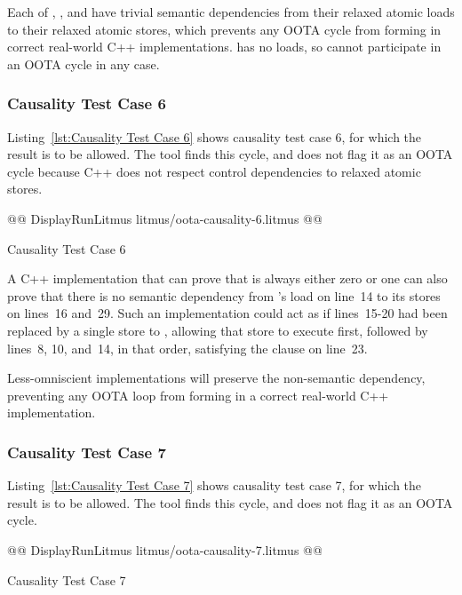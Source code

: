 \documentclass[10]{article}
\begin{document}
Each of , , and  have trivial semantic
dependencies from their relaxed atomic loads to their relaxed
atomic stores, which prevents any OOTA cycle from forming in correct
real-world C++ implementations.
 has no loads, so cannot participate in an OOTA cycle in
any case.

\subsubsection{Causality Test Case 6}
\label{app:Causality Test Case 6}

Listing~\ref{lst:Causality Test Case 6}
shows causality test case 6, for which the 
result is to be allowed.
The  tool finds this cycle, and does not flag it as an OOTA
cycle because C++ does not respect control dependencies to relaxed
atomic stores.

\begin{listing}[tbp]
@@ DisplayRunLitmus litmus/oota-causality-6.litmus @@
\caption{Causality Test Case 6}
\label{lst:Causality Test Case 6}
\end{listing}

A C++ implementation that can prove that  is always either
zero or one can also prove that there is no semantic dependency
from 's load on line~14 to its stores on lines~16 and~29.
Such an implementation could act as if lines~15-20 had been replaced
by a single store to , allowing that store to execute first,
followed by lines~8, 10, and~14, in that order, satisfying the
 clause on line~23.

Less-omniscient implementations will preserve the non-semantic
dependency, preventing any OOTA loop from forming in a correct real-world C++
implementation.

\subsubsection{Causality Test Case 7}
\label{app:Causality Test Case 7}

Listing~\ref{lst:Causality Test Case 7}
shows causality test case 7, for which the 
result is to be allowed.
The  tool finds this cycle, and does not flag it as an OOTA cycle.

\begin{listing}[tbp]
@@ DisplayRunLitmus litmus/oota-causality-7.litmus @@
\caption{Causality Test Case 7}
\label{lst:Causality Test Case 7}
\end{listing}
\end{document}
